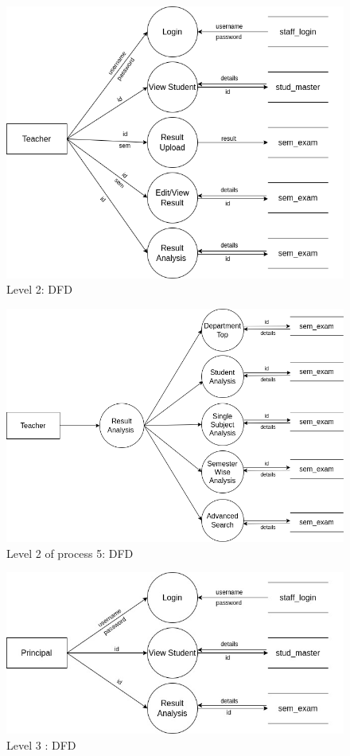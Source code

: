 \documentclass{nascproject}
\begin{document}
\begin{figure}
	\centering
	\includegraphics[width=1\linewidth]{level_teacher.png}
	\caption{Level 2: DFD}
	\label{level_teacher}
\end{figure}
\begin{figure}
	\centering
	\includegraphics[width=1\linewidth]{level_tea.png}
	\caption{Level 2 of process 5: DFD}
	\label{level_tea}
\end{figure}
\begin{figure}
	\centering
	\includegraphics[width=1\linewidth]{level_p.jpg}
	\caption{Level 3 : DFD}
	\label{level_prin}
\end{figure}
\end{document}
